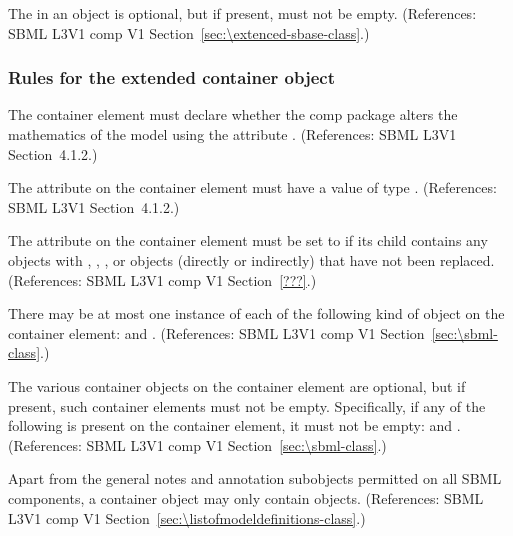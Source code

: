 \begin{sbmlenum}
 { The \ListOfReplacedElements in an \SBase object is
  optional, but if present, must not be empty.
  (References: SBML L3V1 comp V1 Section~\ref{sec:\extenced-sbase-class}.) }


\end{sbmlenum} \subsubsection*{Rules for the extended  container object} \begin{sbmlenum}

 { The  container element must declare whether 
  the comp package alters the mathematics of the model using the attribute
  .  
  (References: SBML L3V1 Section~4.1.2.) }
  

 { The attribute  on the  
  container element must have a value of type .  
  (References: SBML L3V1 Section~4.1.2.) }
  

 { The attribute  on the  
  container element must be set to  if its
  \Model child contains any \Submodel objects with \Species, \Parameter,
  \Reaction, or \Event objects (directly or indirectly) that have not been
  replaced. 
  (References: SBML L3V1 comp V1 Section~\ref{???}.) }


 { There may be at most one instance of each of the
  following kind of object on the  container element:  
  \ListOfModelDefinitions and \ListOfExternalModelDefinitions. 
  (References: SBML L3V1 comp V1 Section~\ref{sec:\sbml-class}.) }


 { The various  container objects on 
  the  container element are optional, but if present, such 
  container elements must not be empty. Specifically, if any of the following 
  is present on the  container element, it must not be empty: 
  \ListOfModelDefinitions and \ListOfExternalModelDefinitions.
  (References: SBML L3V1 comp V1 Section~\ref{sec:\sbml-class}.) }
  

 { Apart from the general notes and annotation
  subobjects permitted on all SBML components, a \ListOfModelDefinitions
  container object may only contain \ModelDefinition objects.
  (References: SBML L3V1 comp V1 Section~\ref{sec:\listofmodeldefinitions-class}.) }



\end{sbmlenum}
